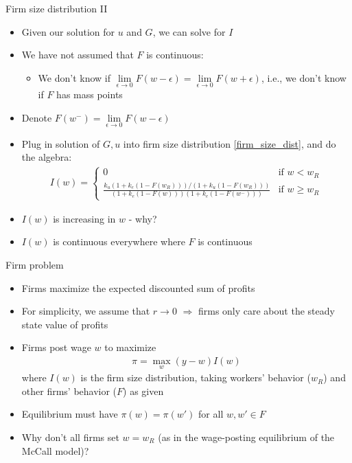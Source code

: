 \documentclass[9pt]{beamer}
\newcommand{\bit}{\begin{itemize}}
\newcommand{\eit}{\end{itemize}}
\newcommand{\lb}{\label}
\begin{document}
\begin{frame}{Firm size distribution II}

\bit
\setlength\itemsep{1.5em}

\item Given our solution for $u$ and $G$, we can solve for $I$

\item We have not assumed that $F$ is continuous:
\bit
	\item We don't know if $\lim\limits_{\epsilon \rightarrow 0}F(w-\epsilon) = \lim\limits_{\epsilon \rightarrow 0}F(w+\epsilon)$, i.e., we don't know if $F$ has mass points
\eit

\item Denote $F(w^{-}) = \lim\limits_{\epsilon \rightarrow 0}F(w-\epsilon)$

\item Plug in solution of $G,u$ into firm size distribution \eqref{firm_size_dist}, and do the algebra:
\begin{eqnarray}
\lb{firm_size}
I(w) = \left\{ \begin{array}{cc}
0 & \text{if } w < w_R \\
\frac{k_u (1+k_e(1-F(w_R)))/(1+k_u(1-F(w_R)))}{(1+k_e(1-F(w)))(1+k_e(1-F(w^{-})))} & \text{if } w \geq w_R
\end{array} \right.
\end{eqnarray}

\item $I(w)$ is increasing in $w$ - why?

\item $I(w)$ is continuous everywhere where $F$ is continuous

\eit

\end{frame}

\begin{frame}{Firm problem}

\bit
\setlength\itemsep{2em}

\item Firms maximize the expected discounted sum of profits

\item For simplicity, we assume that $r \rightarrow 0$ $\Rightarrow$ firms only care about the steady state value of profits

\item Firms post wage $w$ to maximize
\begin{eqnarray}
\lb{firm_problem}
\pi = \max_{w} (y-w) I(w)
\end{eqnarray}
where $I(w)$ is the firm size distribution, taking workers' behavior ($w_R$) and other firms' behavior ($F$) as given

\item Equilibrium must have $\pi(w)=\pi(w')$ for all $w,w'\in F$

\item Why don't all firms set $w=w_R$ (as in the wage-posting equilibrium of the McCall model)?

\eit

\end{frame}
\end{document}
